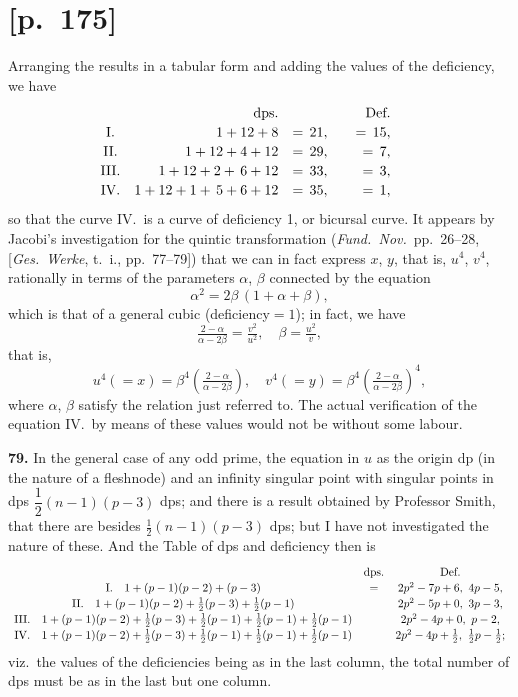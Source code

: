 \documentclass[11pt]{article}
\begin{document}
\section*{[p.~175]}
Arranging the results in a tabular form and adding the values of the deficiency,
we have
\[
\begin{array}{c@{\quad}rclrcl}
   & \text{dps.}     &      &        & \text{Def.}    &&\\
\text{I.}   & 1+12+8         & =\,21,  &&  =\,15, &&\\
\text{II.}  & 1+12+4+12      & =\,29,  &&  =\,7,  &&\\
\text{III.} & 1+12+2+\,6+12  & =\,33,  &&  =\,3,  &&\\
\text{IV.}  & 1+12+1+\,5+6+12& =\,35,  &&  =\,1,  &&\\
\end{array}
\]
so that the curve IV.\ is a curve of deficiency 1, or bicursal curve. It appears by
Jacobi's investigation for the quintic transformation (\textit{Fund.\ Nov.}\ pp.~26--28, [\textit{Ges.\ Werke},
t.~i., pp.~77--79]) that we can in fact express $x$, $y$, that is, $u^4$, $v^4$, rationally in terms
of the parameters $\alpha$, $\beta$ connected by the equation
\[
\alpha^2=2\beta\,(1+\alpha+\beta),
\]
which is that of a general cubic (deficiency$=1$); in fact, we have
\[
\tfrac{2-\alpha}{\alpha-2\beta}=\tfrac{v^2}{u^2},\quad \beta=\tfrac{u^2}{v},
\]
that is,
\[
u^4(=x)=\beta^4\!\left(\tfrac{2-\alpha}{\alpha-2\beta}\right)\!,\quad v^4(=y)=\beta^4\!\left(\tfrac{2-\alpha}{\alpha-2\beta}\right)^{\!4}\!,
\]
where $\alpha$, $\beta$ satisfy the relation just referred to. The actual verification of the equation
IV.\ by means of these values would not be without some labour.

\medskip
\noindent\textbf{79.} In the general case of any odd prime, the equation in $u$ as the origin dp
(in the nature of a fleshnode) and an infinity singular point with singular points in dps
$\dfrac{1}{2}(n-1)(p-3)$ dps; and there is a result obtained by Professor Smith, that there are besides
$\tfrac{1}{2}(n-1)(p-3)$ dps; but I have not investigated the nature of these. And the Table of dps and
deficiency then is
\[
\renewcommand{\arraystretch}{1.15}
\begin{array}{c@{\quad}cc}
                                            & \text{dps.} & \text{Def.}\\
\text{I.}\quad 1+(p-1)(p-2)+(p-3)            & = & 2p^2-7p+6,\ 4p-5,\\
\text{II.}\quad 1+(p-1)(p-2)+\tfrac{1}{2}(p-3)+\tfrac{1}{2}(p-1)    & & 2p^2-5p+0,\ 3p-3,\\
\text{III.}\quad 1+(p-1)(p-2)+\tfrac{1}{2}(p-3)+\tfrac{1}{2}(p-1)+\tfrac{1}{2}(p-1)+\tfrac{1}{2}(p-1)  & & 2p^2-4p+0,\ p-2,\\
\text{IV.}\quad 1+(p-1)(p-2)+\tfrac{1}{2}(p-3)+\tfrac{1}{2}(p-1)+\tfrac{1}{2}(p-1)+\tfrac{1}{2}(p-1)  & & 2p^2-4p+\tfrac{1}{2},\ \tfrac{1}{2}p-\tfrac{1}{2};
\end{array}
\]
viz.\ the values of the deficiencies being as in the last column, the total number of
dps must be as in the last but one column.
\end{document}
